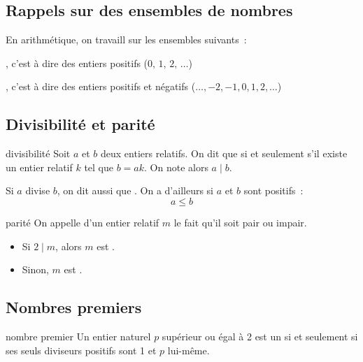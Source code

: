 \subsection{Rappels sur des ensembles de nombres}
En arithmétique, on travaill sur les ensembles suivants~:
\begin{enumeratebf}
    \item {}, c'est à dire des entiers positifs ($0,\, 1,\, 2,\, \dots$)
    \item {}, c'est à dire des entiers positifs et négatifs ($\dots, -2, -1, 0, 1, 2, \dots$)

\subsection{Divisibilité et parité}
\begin{definition}{}{divisibilité}
    Soit \(a\) et \(b\) deux entiers relatifs. On dit que  si et seulement s'il existe un entier relatif \(k\) tel que \(b = a k\). On note alors \(a \mid b\).
\end{definition}

\begin{remarque}{}{}
    Si \(a\) divise \(b\), on dit aussi que . On a d'ailleurs si $a$ et $b$ sont positifs~:
    $$a \leq b$$
\end{remarque}

\begin{definition}{}{parité}
    On appelle  d'un entier relatif $m$ le fait qu'il soit pair ou impair.
    \begin{itemize}
        \item Si $2 \mid m$, alors $m$ est .
        \item Sinon, $m$ est .
    \end{itemize}
\end{definition}

\subsection{Nombres premiers}

\begin{definition}{}{nombre premier}
    Un entier naturel \(p\) supérieur ou égal à 2 est un  si et seulement si ses seuls diviseurs positifs sont 1 et \(p\) lui-même.
\end{definition}


\end{enumeratebf}
